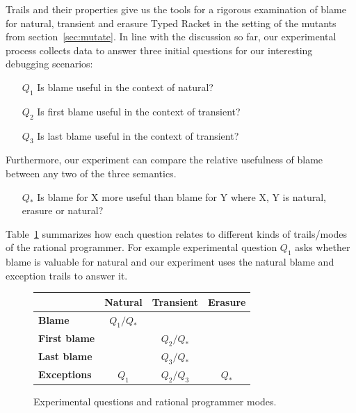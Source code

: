 Trails and their properties give us the tools for a rigorous examination
of blame for natural, transient and erasure Typed Racket in the setting of the 
mutants from section~\ref{sec:mutate}. In line with the discussion so far, 
our experimental process collects data to answer three initial questions
for our interesting debugging scenarios:
\begin{itemize}
\item[$Q_1$] Is blame useful in the context of natural?

\item[$Q_2$] Is first blame useful in the context of transient?

\item[$Q_3$] Is last blame useful in the context of transient?

\end{itemize}

Furthermore, our experiment can compare the relative usefulness of blame
between any two of the three semantics. 
\begin{itemize}
\item[$Q_*$] Is blame for X more useful than blame for Y where X, Y is natural,
  erasure or natural?
\end{itemize}


Table~\ref{fig:experiment-outline} summarizes how each question relates to
different kinds of trails/modes of the rational programmer. For example experimental
question $Q_1$ asks whether blame is valuable for natural and our experiment
uses the natural blame and exception trails to answer it.

\begin{figure}[ht]
\center
{\begin{tabular}{l|c|c|c}
                        & {\bf Natural}  & {\bf Transient} &  {\bf Erasure} \\ \hline 
{\bf Blame}             &  $Q_1/Q_*$    &                  &                \\
{\bf First blame}       &               &     $Q_2/Q_*$    &                 \\
{\bf Last blame}        &               &     $Q_3/Q_*$    &                 \\
{\bf Exceptions}        &      $Q_1$    &     $Q_2/Q_3$    &      $Q_*$      \\
\end{tabular}}
  \caption{ Experimental questions and rational programmer modes.}
  \label{fig:experiment-outline}
\end{figure}

